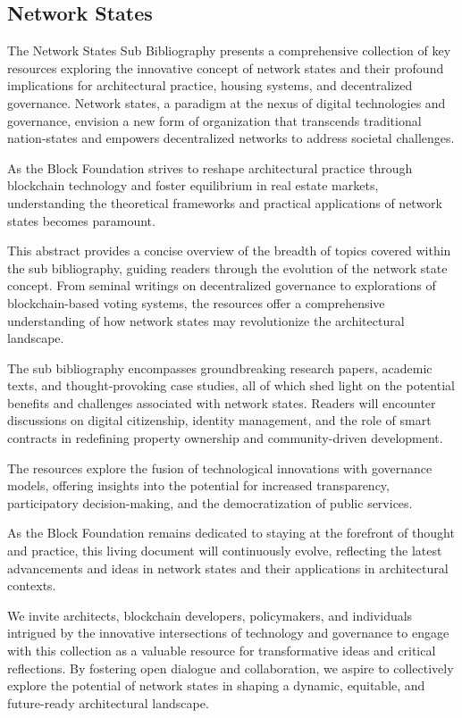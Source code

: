 \subsection{Network States}



The Network States Sub Bibliography presents a comprehensive collection of key resources exploring the innovative concept of network states and their profound implications for architectural practice, housing systems, and decentralized governance. Network states, a paradigm at the nexus of digital technologies and governance, envision a new form of organization that transcends traditional nation-states and empowers decentralized networks to address societal challenges.

As the Block Foundation strives to reshape architectural practice through blockchain technology and foster equilibrium in real estate markets, understanding the theoretical frameworks and practical applications of network states becomes paramount.

This abstract provides a concise overview of the breadth of topics covered within the sub bibliography, guiding readers through the evolution of the network state concept. From seminal writings on decentralized governance to explorations of blockchain-based voting systems, the resources offer a comprehensive understanding of how network states may revolutionize the architectural landscape.

The sub bibliography encompasses groundbreaking research papers, academic texts, and thought-provoking case studies, all of which shed light on the potential benefits and challenges associated with network states. Readers will encounter discussions on digital citizenship, identity management, and the role of smart contracts in redefining property ownership and community-driven development.

The resources explore the fusion of technological innovations with governance models, offering insights into the potential for increased transparency, participatory decision-making, and the democratization of public services.

As the Block Foundation remains dedicated to staying at the forefront of thought and practice, this living document will continuously evolve, reflecting the latest advancements and ideas in network states and their applications in architectural contexts.

We invite architects, blockchain developers, policymakers, and individuals intrigued by the innovative intersections of technology and governance to engage with this collection as a valuable resource for transformative ideas and critical reflections. By fostering open dialogue and collaboration, we aspire to collectively explore the potential of network states in shaping a dynamic, equitable, and future-ready architectural landscape.




